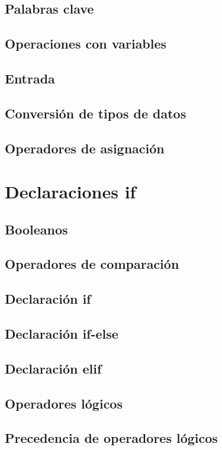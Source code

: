 \documentclass{article}
\begin{document}
      \subsection{Palabras clave}
      \subsection{Operaciones con variables}
      \subsection{Entrada}
      \subsection{Conversión de tipos de datos}
      \subsection{Operadores de asignación}
    
    \section{Declaraciones if}

      \subsection{Booleanos}
      \subsection{Operadores de comparación}
      \subsection{Declaración if}
      \subsection{Declaración if-else}
      \subsection{Declaración elif}
      \subsection{Operadores lógicos}
      \subsection{Precedencia de operadores lógicos}
\end{document}
